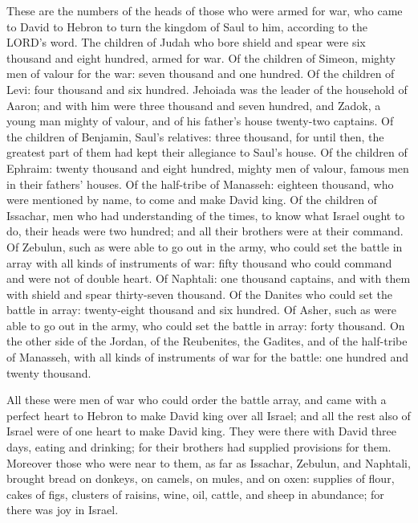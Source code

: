  These are the numbers of the heads of those who were armed
for war, who came to David to Hebron to turn the kingdom of Saul to him,
according to the LORD's word.  The children of Judah who
bore shield and spear were six thousand and eight hundred, armed for
war.  Of the children of Simeon, mighty men of valour for
the war: seven thousand and one hundred.  Of the children
of Levi: four thousand and six hundred.  Jehoiada was the
leader of the household of Aaron; and with him were three thousand and
seven hundred,  and Zadok, a young man mighty of valour,
and of his father's house twenty-two captains.  Of the
children of Benjamin, Saul's relatives: three thousand, for until then,
the greatest part of them had kept their allegiance to Saul's house.
 Of the children of Ephraim: twenty thousand and eight
hundred, mighty men of valour, famous men in their fathers' houses.
 Of the half-tribe of Manasseh: eighteen thousand, who were
mentioned by name, to come and make David king.  Of the
children of Issachar, men who had understanding of the times, to know
what Israel ought to do, their heads were two hundred; and all their
brothers were at their command.  Of Zebulun, such as were
able to go out in the army, who could set the battle in array with all
kinds of instruments of war: fifty thousand who could command and were
not of double heart.  Of Naphtali: one thousand captains,
and with them with shield and spear thirty-seven thousand. 
Of the Danites who could set the battle in array: twenty-eight thousand
and six hundred.  Of Asher, such as were able to go out in
the army, who could set the battle in array: forty thousand.
 On the other side of the Jordan, of the Reubenites, the
Gadites, and of the half-tribe of Manasseh, with all kinds of
instruments of war for the battle: one hundred and twenty thousand.

 All these were men of war who could order the battle
array, and came with a perfect heart to Hebron to make David king over
all Israel; and all the rest also of Israel were of one heart to make
David king.  They were there with David three days, eating
and drinking; for their brothers had supplied provisions for them.
 Moreover those who were near to them, as far as Issachar,
Zebulun, and Naphtali, brought bread on donkeys, on camels, on mules,
and on oxen: supplies of flour, cakes of figs, clusters of raisins,
wine, oil, cattle, and sheep in abundance; for there was joy in Israel.


